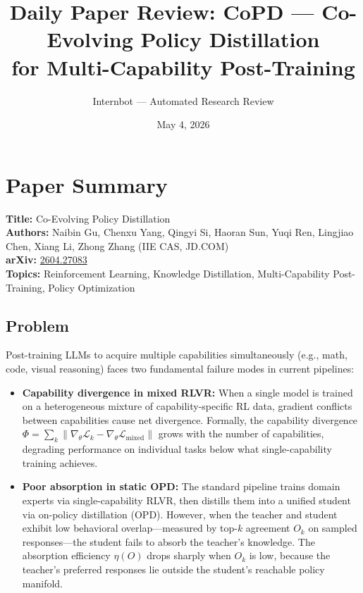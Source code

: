 \documentclass[11pt]{article}
\title{Daily Paper Review: CoPD --- Co-Evolving Policy Distillation\\for Multi-Capability Post-Training}
\author{Internbot --- Automated Research Review}
\date{May 4, 2026}
\begin{document}
\maketitle

\section{Paper Summary}

\textbf{Title:} Co-Evolving Policy Distillation \\
\textbf{Authors:} Naibin Gu, Chenxu Yang, Qingyi Si, Haoran Sun, Yuqi Ren, Lingjiao Chen, Xiang Li, Zhong Zhang (IIE CAS, JD.COM) \\
\textbf{arXiv:} \href{https://arxiv.org/abs/2604.27083}{2604.27083} \\
\textbf{Topics:} Reinforcement Learning, Knowledge Distillation, Multi-Capability Post-Training, Policy Optimization

\subsection{Problem}

Post-training LLMs to acquire multiple capabilities simultaneously (e.g., math, code, visual reasoning) faces two fundamental failure modes in current pipelines:

\begin{itemize}
    \item \textbf{Capability divergence in mixed RLVR:} When a single model is trained on a heterogeneous mixture of capability-specific RL data, gradient conflicts between capabilities cause net divergence. Formally, the capability divergence $\Phi = \sum_{k} \|\nabla_\theta \mathcal{L}_k - \nabla_\theta \mathcal{L}_{\mathrm{mixed}}\|$ grows with the number of capabilities, degrading performance on individual tasks below what single-capability training achieves.
    \item \textbf{Poor absorption in static OPD:} The standard pipeline trains domain experts via single-capability RLVR, then distills them into a unified student via on-policy distillation (OPD). However, when the teacher and student exhibit low behavioral overlap---measured by top-$k$ agreement $O_k$ on sampled responses---the student fails to absorb the teacher's knowledge. The absorption efficiency $\eta(O)$ drops sharply when $O_k$ is low, because the teacher's preferred responses lie outside the student's reachable policy manifold.
\end{itemize}
\end{document}
